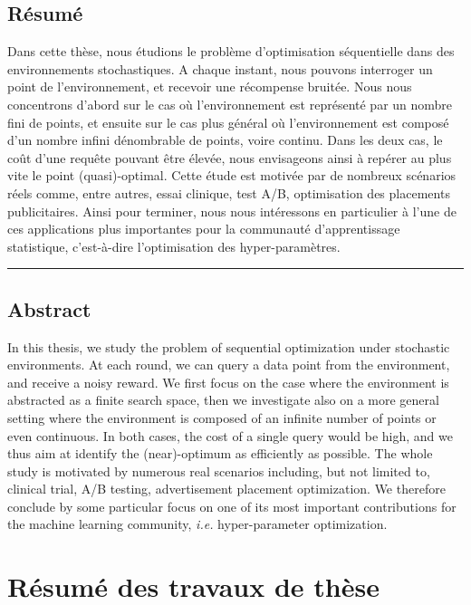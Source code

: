 \section*{\centering R\'esum\'e}

Dans cette th\`ese, nous \'etudions le probl\`eme d'optimisation s\'equentielle dans des enviro\-nnements stochastiques. A chaque instant, nous pouvons interroger un point de l'enviro\-nnement, et recevoir une récompense bruit\'ee. Nous nous concentrons d'abord sur le cas o\`u l'environnement est représenté par un nombre fini de points, et ensuite sur le cas plus g\'en\'eral o\`u l'environnement est composé d'un nombre infini d\'enombrable de points, voire continu. Dans les deux cas, le co\^ut d'une requ\^ete pouvant \^etre \'elev\'ee, nous envisageons ainsi \`a rep\'erer au plus vite le point (quasi)-optimal. Cette \'etude est motiv\'ee par de nombreux sc\'enarios r\'eels comme, entre autres, essai clinique, test A/B, optimisation des placements publicitaires. Ainsi pour terminer, nous nous int\'eressons en particulier \`a l'une de ces applications plus importantes pour la communaut\'e d'apprentissage statistique, c'est-\`a-dire l'optimisation des hyper-param\`etres.

\begin{center}
    \rule{8cm}{0.4pt}
\end{center}

\section*{\centering Abstract}

In this thesis, we study the problem of sequential optimization under stochastic environments. At each round, we can query a data point from the environment, and receive a noisy reward. We first focus on the case where the environment is abstracted as a finite search space, then we investigate also on a more general setting where the environment is composed of an infinite number of points or even continuous. In both cases, the cost of a single query would be high, and we thus aim at identify the (near)-optimum as efficiently as possible. The whole study is motivated by numerous real scenarios including, but not limited to, clinical trial, A/B testing, advertisement placement optimization. We therefore conclude by some particular focus on one of its most important contributions for the machine learning community, \emph{i.e.} hyper-parameter optimization.


\chapter*{R\'esum\'e des travaux de thèse}

